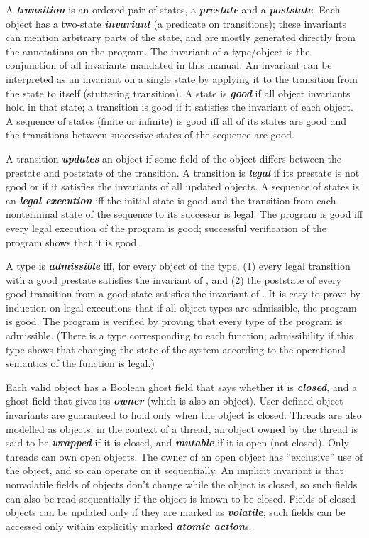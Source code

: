 \documentclass[preprint,nocopyrightspace]{sigplanconf}
\newcommand{\Def}[1]{\textit{\textbf{#1}}}
\begin{document}
A \Def{transition} is an ordered pair of states, a \Def{prestate} and
a \Def{poststate}.  Each object has a two-state \Def{invariant} (a
predicate on transitions); these invariants can mention arbitrary
parts of the state, and are mostly generated directly from the
annotations on the program. The invariant of a type/object is the
conjunction of all invariants mandated in this manual.  An invariant
can be interpreted as an invariant on a single state by applying it to
the transition from the state to itself (stuttering transition). A state
is \Def{good} if all object invariants hold in that state; a
transition is good if it satisfies the invariant of each object. A
sequence of states (finite or infinite) is good iff all of its states
are good and the transitions between successive states of the sequence
are good.

A transition \Def{updates} an object if some field of the object differs
between the prestate and poststate of the transition. A transition
is \Def{legal} if its prestate is not good or if it satisfies the
invariants of all updated objects. A sequence of states is an
\Def{legal execution} iff the initial state
is good and the transition from each nonterminal state of the sequence
to its successor is legal. The program is good iff every legal execution of
the program is good; successful verification of the program shows that
it is good.

A type is \Def{admissible} iff, for every object  of the type,
(1) every legal transition with a good prestate satisfies the
invariant of , and (2) the poststate of every good transition
from a good state satisfies the invariant of . It is easy to
prove by induction on legal executions that if all object types are
admissible, the program is good. The program is verified by proving
that every type of the program is admissible. (There is a type
corresponding to each function; admissibility if this type shows that 
changing the state of the system according to the operational
semantics of the function is legal.)

Each valid object has a Boolean ghost field that says whether it
is \Def{closed}, and a ghost field that gives its \Def{owner} (which
is also an object).  User-defined object invariants are guaranteed to
hold only when the object is closed. Threads are also modelled as
objects; in the context of a thread, an object owned by the thread is
said to be \Def{wrapped} if it is closed, and \Def{mutable} if it is
open (not closed). Only threads can own open objects.  The owner of an
open object has ``exclusive'' use of the object, and so can operate on
it sequentially. An implicit invariant is that nonvolatile fields of
objects don't change while the object is closed, so such fields can
also be read sequentially if the object is known to be closed.
Fields of closed objects can be updated only if they
are marked as \Def{volatile}; such fields can be accessed only within
explicitly marked \Def{atomic action}s.
\end{document}
